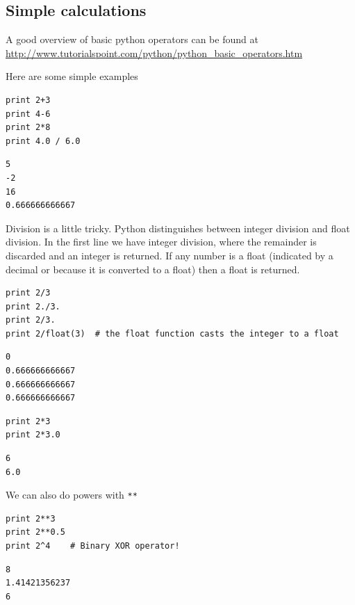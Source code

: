 \documentclass[11pt]{article}
\begin{document}
\subsection{Simple calculations}
\label{sec-3-1}

A good overview of basic python operators can be found at \url{http://www.tutorialspoint.com/python/python_basic_operators.htm}

Here are some simple examples
\begin{verbatim}
print 2+3
print 4-6
print 2*8
print 4.0 / 6.0
\end{verbatim}

\begin{verbatim}
5
-2
16
0.666666666667
\end{verbatim}


Division is a little tricky. Python distinguishes between integer division and float division. In the first line we have integer division, where the remainder is discarded and an integer is returned. If any number is a float (indicated by a decimal or because it is converted to a float) then a float is returned.

\begin{verbatim}
print 2/3
print 2./3.
print 2/3.
print 2/float(3)  # the float function casts the integer to a float
\end{verbatim}

\begin{verbatim}
0
0.666666666667
0.666666666667
0.666666666667
\end{verbatim}

\begin{verbatim}
print 2*3
print 2*3.0
\end{verbatim}

\begin{verbatim}
6
6.0
\end{verbatim}

We can also do powers with \texttt{**}

\begin{verbatim}
print 2**3
print 2**0.5
print 2^4    # Binary XOR operator!
\end{verbatim}

\begin{verbatim}
8
1.41421356237
6
\end{verbatim}
\end{document}
